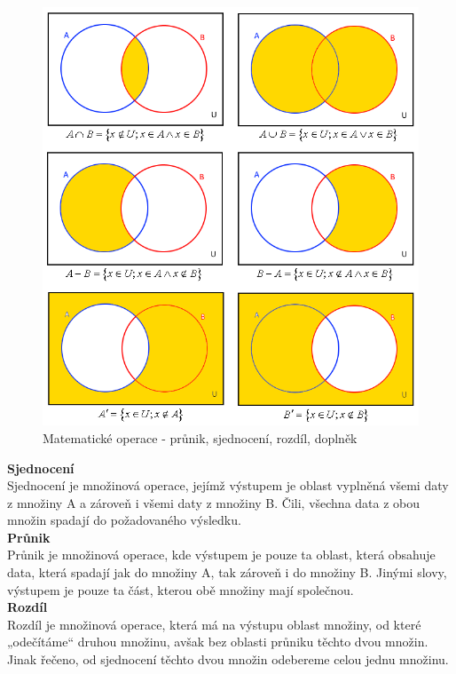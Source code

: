 \documentclass[a4paper,11pt,twoside]{article}
\begin{document}
\vspace{0.2cm}
\begin{figure}[hbt!] 
\begin{center}
\includegraphics[width=12cm]{pictures/operace.png} 
\caption[Matematické operace - průnik, sjednocení, rozdíl \cite{problem2}]{Matematické operace - průnik, sjednocení, rozdíl, doplněk \cite{problem2}}
\label{fig:operace}
\end{center}
\end{figure}

\noindent\textbf{Sjednocení}\\
\noindent Sjednocení je množinová operace, jejímž výstupem je oblast vyplněná všemi daty z množiny A a zároveň i všemi daty z množiny B. Čili, všechna data z obou množin spadají do požadovaného výsledku.\\

\noindent\textbf{Průnik}\\
\noindent Průnik je množinová operace, kde výstupem je pouze ta oblast, která obsahuje data, která spadají jak do množiny A, tak zároveň i do množiny B. Jinými slovy, výstupem je pouze ta část, kterou obě množiny mají společnou.\\

\noindent\textbf{Rozdíl}\\
\noindent Rozdíl je množinová operace, která má na výstupu oblast množiny, od které „odečítáme“ druhou množinu, avšak bez oblasti průniku těchto dvou množin. Jinak řečeno, od sjednocení těchto dvou množin odebereme celou jednu množinu.\\
\end{document}
